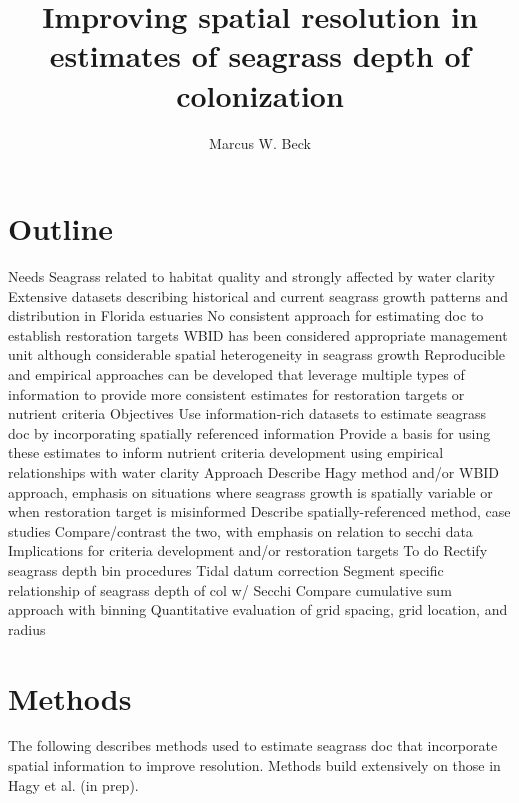 \documentclass[letterpaper,12pt]{article}\usepackage[]{graphicx}\usepackage[]{color}
\begin{document}
\setlength{\parskip}{5mm}
\setlength{\parindent}{0in}

\title{Improving spatial resolution in estimates of seagrass depth of colonization}
\author{Marcus W. Beck}
\maketitle

\section{Outline}
\begin{outline}
\1 Needs
\2 Seagrass related to habitat quality and strongly affected by water clarity
\2 Extensive datasets describing historical and current seagrass growth patterns and distribution in Florida estuaries
\2 No consistent approach for estimating \ac{doc} to establish restoration targets
\2 WBID has been considered appropriate management unit although considerable spatial heterogeneity in seagrass growth
\2 Reproducible and empirical approaches can be developed that leverage multiple types of information to provide more consistent estimates for restoration targets or nutrient criteria
\1 Objectives
\2 Use information-rich datasets to estimate seagrass \ac{doc} by incorporating spatially referenced information
\2 Provide a basis for using these estimates to inform nutrient criteria development using empirical relationships with water clarity
\1 Approach
\2 Describe Hagy method and/or WBID approach, emphasis on situations where seagrass growth is spatially variable or when restoration target is misinformed
\2 Describe spatially-referenced method, case studies
\2 Compare/contrast the two, with emphasis on relation to secchi data
\2 Implications for criteria development and/or restoration targets
\1 To do
\2 Rectify seagrass depth bin procedures
\2 Tidal datum correction
\2 Segment specific relationship of seagrass depth of col w/ Secchi
\2 Compare cumulative sum approach with binning
\2 Quantitative evaluation of grid spacing, grid location, and radius
\end{outline}

\section{Methods}

The following describes methods used to estimate seagrass \ac{doc} that incorporate spatial information to improve resolution.  Methods build extensively on those in Hagy et al. (in prep).  
\end{document}
